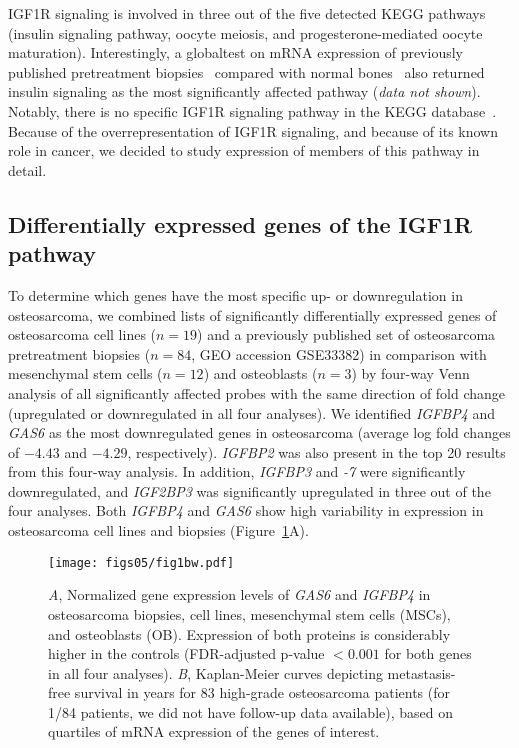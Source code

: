 %
IGF1R signaling is involved in three out of the five detected KEGG pathways (insulin signaling pathway, oocyte meiosis, and progesterone\hyp{}mediated oocyte maturation). Interestingly, a globaltest on mRNA expression of previously published pretreatment biopsies~\cite{kuijjer2012identification} compared with normal bones~\cite{namlos2012global} also returned insulin signaling as the most significantly affected pathway ({\it data not shown}). Notably, there is no specific IGF1R signaling pathway in the KEGG database~\cite{kanehisa2000kegg}. Because of the overrepresentation of IGF1R signaling, and because of its known role in cancer, we decided to study expression of members of this pathway in detail. 

\subsection{Differentially expressed genes of the IGF1R pathway}
To determine which genes have the most specific up- or downregulation in osteosarcoma, we combined lists of significantly differentially expressed genes of osteosarcoma cell lines ($n=19$) and a previously published set of osteosarcoma pretreatment biopsies ($n=84$, GEO accession GSE33382) in comparison with mesenchymal stem cells ($n=12$) and osteoblasts ($n=3$) by four\hyp{}way Venn analysis of all significantly affected probes with the same direction of fold change (upregulated or downregulated in all four analyses). We identified {\it IGFBP4} and {\it GAS6} as the most downregulated genes in osteosarcoma (average log fold changes of $-4.43$ and  $-4.29$, respectively). {\it IGFBP2} was also present in the top 20 results from this four\hyp{}way analysis. In addition, {\it IGFBP3} and {\it -7} were significantly downregulated, and {\it IGF2BP3} was significantly upregulated in three out of the four analyses. Both {\it IGFBP4} and {\it GAS6} show high variability in expression in osteosarcoma cell lines and biopsies (Figure~\ref{fig5.1}A).
%
\begin{figure}[htbp]
	\centering
	\texttt{[image: figs05/fig1bw.pdf]}	%
	\caption{{\it A}, Normalized gene expression levels of {\it GAS6} and {\it IGFBP4} in osteosarcoma biopsies, cell lines, mesenchymal stem cells (MSCs), and osteoblasts (OB). Expression of both proteins is considerably higher in the controls (FDR\hyp{}adjusted p-value $<0.001$ for both genes in all four analyses). {\it B}, Kaplan\hyp{}Meier curves depicting metastasis\hyp{}free survival in years for 83 high\hyp{}grade osteosarcoma patients (for 1/84 patients, we did not have follow\hyp{}up data available), based on quartiles of mRNA expression of the genes of interest.}
	\label{fig5.1}
\end{figure}
